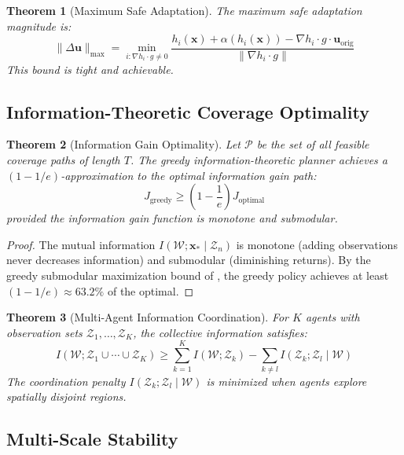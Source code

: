 \documentclass[12pt,a4paper,twocolumn]{article}
\newcommand{\cW}{\mathcal{W}}
\newcommand{\cP}{\mathcal{P}}
\newcommand{\cZ}{\mathcal{Z}}
\newcommand{\vect}[1]{\mathbf{#1}}
\newtheorem{theorem}{Theorem}[section]
\begin{document}
\begin{theorem}[Maximum Safe Adaptation]
\label{thm:max_adapt}
The maximum safe adaptation magnitude is:
\begin{equation}
    \|\Delta\vect{u}\|_{\max} = \min_{i: \nabla h_i \cdot g \neq 0} \frac{h_i(\vect{x}) + \alpha(h_i(\vect{x})) - \nabla h_i \cdot g \cdot \vect{u}_{\text{orig}}}{\|\nabla h_i \cdot g\|}
\end{equation}
This bound is tight and achievable.
\end{theorem}

\subsection{Information-Theoretic Coverage Optimality}

\begin{theorem}[Information Gain Optimality]
\label{thm:info_opt}
Let $\cP$ be the set of all feasible coverage paths of length $T$. The greedy information-theoretic planner achieves a $(1-1/e)$-approximation to the optimal information gain path:
\begin{equation}
    J_{\text{greedy}} \geq \left(1 - \frac{1}{e}\right) J_{\text{optimal}}
\end{equation}
provided the information gain function is monotone and submodular.
\end{theorem}

\begin{proof}
The mutual information $I(\cW; \vect{x}_* \mid \cZ_n)$ is monotone (adding observations never decreases information) and submodular (diminishing returns). By the greedy submodular maximization bound of \citet{Nemhauser1978}, the greedy policy achieves at least $(1-1/e) \approx 63.2\%$ of the optimal.
\end{proof}

\begin{theorem}[Multi-Agent Information Coordination]
\label{thm:info_coord}
For $K$ agents with observation sets $\cZ_1, \ldots, \cZ_K$, the collective information satisfies:
\begin{equation}
    I(\cW; \cZ_1 \cup \cdots \cup \cZ_K) \geq \sum_{k=1}^K I(\cW; \cZ_k) - \sum_{k \neq l} I(\cZ_k; \cZ_l \mid \cW)
\end{equation}
The coordination penalty $I(\cZ_k; \cZ_l \mid \cW)$ is minimized when agents explore spatially disjoint regions.
\end{theorem}

\subsection{Multi-Scale Stability}
\end{document}
